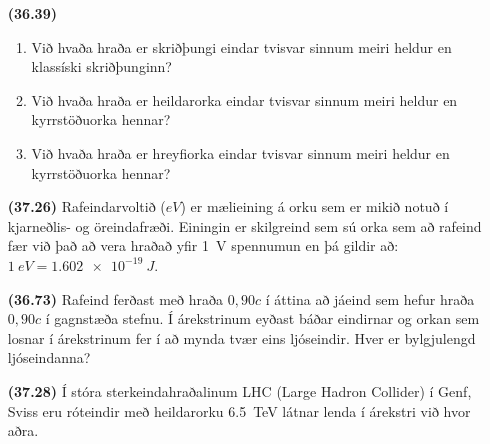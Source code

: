 \ifdefined \wholebook \else\documentclass[oneside]{book}\usepackage{EdlBook}\graphicspath{{figures/}}
\begin{document}
\begin{enumerate}[label = \textbf{(\alph*)}]

\item[\textbf{(36.39)}] \begin{enumerate}[label = \textbf{(\alph*)}]
    \item Við hvaða hraða er skriðþungi eindar tvisvar sinnum meiri heldur en klassíski skriðþunginn?
    \item Við hvaða hraða er heildarorka eindar tvisvar sinnum meiri heldur en kyrrstöðuorka hennar?
    \item Við hvaða hraða er hreyfiorka eindar tvisvar sinnum meiri heldur en kyrrstöðuorka hennar?

\end{enumerate}

\item[\textbf{(37.26)}] Rafeindarvoltið ($\si{eV}$) er mælieining á orku sem er mikið notuð í kjarneðlis- og öreindafræði. Einingin er skilgreind sem sú orka sem að rafeind fær við það að vera hraðað yfir \SI{1}{V} spennumun en þá gildir að: $\SI{1}{eV} = \SI{1.602e-19}{J}$.

\item[\textbf{(36.73)}] Rafeind ferðast með hraða $0,90c$ í áttina að jáeind sem hefur hraða $0,90c$ í gagnstæða stefnu. Í árekstrinum eyðast báðar eindirnar og orkan sem losnar í árekstrinum fer í að mynda tvær eins ljóseindir. Hver er bylgjulengd ljóseindanna?

\item[\textbf{(37.28)}] Í stóra sterkeindahraðalinum LHC (Large Hadron Collider) í Genf, Sviss eru róteindir með heildarorku \SI{6.5}{TeV} látnar lenda í árekstri við hvor aðra.  

\end{enumerate}
\end{document}
